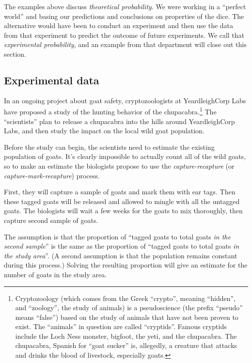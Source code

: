 The examples above discuss \textit{theoretical probability}. We were working in a ``perfect world'' and basing our predictions and conclusions on properties of the dice. The alternative would have been to conduct an experiment and then use the data from that experiment to predict the outcome of future experiments. We call that \textit{experimental probability}, and an example from that department will close out this section.

\subsection{Experimental data}

In an ongoing project about goat safety, cryptozoologists at YeardleighCorp Labs have proposed a study of the hunting behavior of the chupacabra.\footnote{Cryptozoology (which comes from the Greek ``crypto'', meaning ``hidden'', and ``zoology'', the study of animals) is a pseudoscience (the prefix ``pseudo'' means ``false'') based on the study of animals that have not been proven to exist. The ``animals'' in question are called ``cryptids''. Famous cryptids include the Loch Ness monster, bigfoot, the yeti, and the chupacabra. The chupacabra, Spanish for ``goat sucker'' is, allegedly, a creature that attacks and drinks the blood of livestock, especially goats.} The ``scientists'' plan to release a chupacabra into the hills around YeardleighCorp Labs, and then study the impact on the local wild goat population.

Before the study can begin, the scientists need to estimate the existing population of goats. It's clearly impossible to actually count all of the wild goats, so to make an estimate the biologists propose to use the \textit{capture-recapture} (or \textit{capture-mark-recapture}) process.

First, they will capture a sample of goats and mark them with ear tags. Then these tagged goats will be released and allowed to mingle with all the untagged goats. The biologists will wait a few weeks for the goats to mix thoroughly, then capture second sample of goats.

The assumption is that the proportion of ``tagged goats to total goats \textit{in the second sample}'' is the same as the proportion of ``tagged goats to total goats \textit{in the study area}''. (A second assumption is that the population remains constant during this process.) Solving the resulting proportion will give an estimate for the number of goats in the study area.

